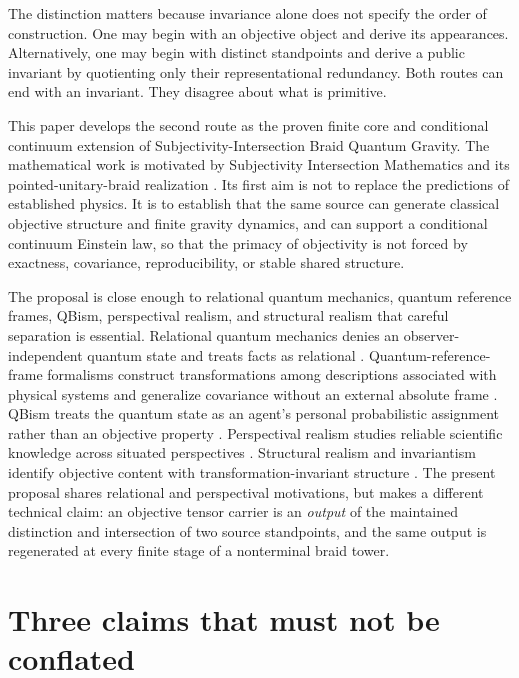 \documentclass[11pt]{article}
\theoremstyle{definition}
\theoremstyle{remark}
\begin{document}
The distinction matters because invariance alone does not specify the order of construction. One may begin with an objective object and derive its appearances. Alternatively, one may begin with distinct standpoints and derive a public invariant by quotienting only their representational redundancy. Both routes can end with an invariant. They disagree about what is primitive.

This paper develops the second route as the proven finite core and conditional continuum extension of Subjectivity-Intersection Braid Quantum Gravity. The mathematical work is motivated by Subjectivity Intersection Mathematics and its pointed-unitary-braid realization \cite{watanabe2026sim,watanabe2026braid}. Its first aim is not to replace the predictions of established physics. It is to establish that the same source can generate classical objective structure and finite gravity dynamics, and can support a conditional continuum Einstein law, so that the primacy of objectivity is not forced by exactness, covariance, reproducibility, or stable shared structure.

The proposal is close enough to relational quantum mechanics, quantum reference frames, QBism, perspectival realism, and structural realism that careful separation is essential. Relational quantum mechanics denies an observer-independent quantum state and treats facts as relational \cite{rovelli1996}. Quantum-reference-frame formalisms construct transformations among descriptions associated with physical systems and generalize covariance without an external absolute frame \cite{giacomini2019,vanrietvelde2020}. QBism treats the quantum state as an agent's personal probabilistic assignment rather than an objective property \cite{fuchs2013}. Perspectival realism studies reliable scientific knowledge across situated perspectives \cite{massimi2022,massimi2023}. Structural realism and invariantism identify objective content with transformation-invariant structure \cite{weyl1952,ladyman1998}. The present proposal shares relational and perspectival motivations, but makes a different technical claim: an objective tensor carrier is an \emph{output} of the maintained distinction and intersection of two source standpoints, and the same output is regenerated at every finite stage of a nonterminal braid tower.

\section{Three claims that must not be conflated}
\end{document}
